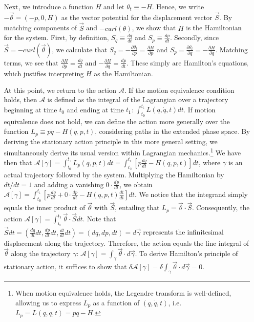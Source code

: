 \documentclass[12pt, english, twoside]{article} %
\renewcommand{\vector}[1]{\ensuremath{\vec{#1}}} %
\newcommand{\integral}{\int}
\begin{document}
Next, we introduce a function $H$ and let $ \theta_t \equiv -H$. Hence, we write $-\vector{\theta} = (-p, 0, H) $ as the vector potential for the displacement vector $\vector{S} $. By matching components of $\vector{S}$ and $-curl(\theta)$, we show that $H$ is the Hamiltonian for the system. First, by definition, $S_q \equiv \frac{dq}{dt} $ and $S_p \equiv  \frac{dp}{dt} $. Secondly, since $\vector{S} = -curl(\vector{\theta}) $, we calculate that $S_q = -\frac{\partial \theta_t}{\partial p} = \frac{\partial H}{\partial p}$ and $S_p = \frac{\partial \theta_t}{\partial q}=-\frac{\partial H}{\partial q}$. Matching terms, we see that $\frac{\partial H}{\partial p} =\frac{dq}{dt} $ and $-\frac{\partial H}{\partial q} =\frac{dp}{dt}$. These simply are Hamilton's equations, which justifies interpreting $H$ as the Hamiltonian.

At this point, we return to the action $ \mathscr{A}$. If the motion equivalence condition holds, then $ \mathscr{A}$ is defined as the integral of the Lagrangian over a trajectory beginning at time $t_0$ and ending at time $t_1$: $\integral^{t_1}_{t_0} L (q, \dot{q}, t) dt$. If motion equivalence does not hold, we can define the action more generally over the function $L_p \equiv p \dot{q} - H(q, p, t)$, considering paths in the extended phase space. By deriving the stationary action principle in this more general setting, we simultaneously derive its usual version within Lagrangian mechanics.\footnote{When motion equivalence holds, the Legendre transform is well-defined, allowing us to express $L_p$ as a function of $(q, \dot{q}, t)$, i.e. $L_p = L(q, \dot{q}, t) = p \dot{q} - H$.} We have then that $ \mathscr{A}[\gamma] = \integral^{t_1}_{t_0} L_p (q, p, t) dt = \integral^{t_1}_{t_0} [p \frac{dq}{dt} - H(q, p, t) ]dt$, where $\gamma$ is an actual trajectory followed by the system. Multiplying the Hamiltonian by $dt/dt = 1$ and adding a vanishing $0 \cdot \frac{dp}{dt}$, we obtain $ \mathscr{A}[\gamma] = \integral^{t_1}_{t_0} [p \frac{dq}{dt} + 0 \cdot \frac{dp}{dt} - H(q, p, t) \frac{dt}{dt} ]dt$. We notice that the integrand simply equals the inner product of $\vector{\theta}$ with $\vector{S} $, entailing that $L_p =\vector{\theta} \cdot \vector{S} $. Consequently, the action $ \mathscr{A} [\gamma] = \integral^{t_1}_{t_0} \vector{\theta} \cdot \vector{S}  dt$. Note that $\vector{S}  dt = (\frac{d q }{d t } dt, \frac{d p }{d t } dt, \frac{d t }{d t }dt ) = (dq, dp, dt) = d\vector{\gamma}$ represents the infinitesimal displacement along the trajectory. Therefore, the action equals the line integral of $\vector{\theta}$ along the trajectory $\gamma $: $ \mathscr{A} [\gamma] =\integral_{\gamma} \vector{\theta} \cdot d\vector{\gamma}$. To derive Hamilton's principle of stationary action, it suffices to show that $\delta \mathscr{A} [\gamma] =\delta \integral_{\gamma} \vector{\theta} \cdot d\vector{\gamma} = 0$. 
\end{document}
